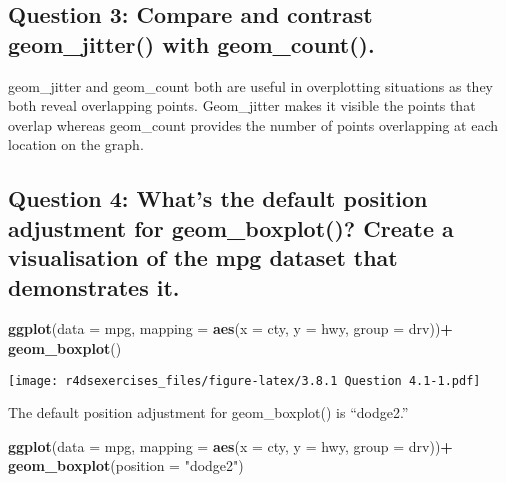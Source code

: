 \documentclass[
]{book}
\newenvironment{Shaded}{\begin{snugshade}}{\end{snugshade}}
\newcommand{\DataTypeTok}[1]{\textcolor[rgb]{0.13,0.29,0.53}{#1}}
\newcommand{\KeywordTok}[1]{\textcolor[rgb]{0.13,0.29,0.53}{\textbf{#1}}}
\newcommand{\NormalTok}[1]{#1}
\newcommand{\OperatorTok}[1]{\textcolor[rgb]{0.81,0.36,0.00}{\textbf{#1}}}
\newcommand{\StringTok}[1]{\textcolor[rgb]{0.31,0.60,0.02}{#1}}
\begin{document}
\hypertarget{question-3-compare-and-contrast-geom_jitter-with-geom_count.}{%
\subsection{Question 3: Compare and contrast geom\_jitter() with geom\_count().}\label{question-3-compare-and-contrast-geom_jitter-with-geom_count.}}

geom\_jitter and geom\_count both are useful in overplotting situations as they both reveal overlapping points. Geom\_jitter makes it visible the points that overlap whereas geom\_count provides the number of points overlapping at each location on the graph.

\hypertarget{question-4-whats-the-default-position-adjustment-for-geom_boxplot-create-a-visualisation-of-the-mpg-dataset-that-demonstrates-it.}{%
\subsection{Question 4: What's the default position adjustment for geom\_boxplot()? Create a visualisation of the mpg dataset that demonstrates it.}\label{question-4-whats-the-default-position-adjustment-for-geom_boxplot-create-a-visualisation-of-the-mpg-dataset-that-demonstrates-it.}}

\begin{Shaded}
\begin{Highlighting}[]
\KeywordTok{ggplot}\NormalTok{(}\DataTypeTok{data =}\NormalTok{ mpg, }\DataTypeTok{mapping =} \KeywordTok{aes}\NormalTok{(}\DataTypeTok{x =}\NormalTok{ cty, }\DataTypeTok{y =}\NormalTok{ hwy, }\DataTypeTok{group =}\NormalTok{ drv))}\OperatorTok{+}
\StringTok{  }\KeywordTok{geom_boxplot}\NormalTok{()}
\end{Highlighting}
\end{Shaded}

\texttt{[image: r4dsexercises\_files/figure-latex/3.8.1 Question 4.1-1.pdf]}

The default position adjustment for geom\_boxplot() is ``dodge2.''

\begin{Shaded}
\begin{Highlighting}[]
\KeywordTok{ggplot}\NormalTok{(}\DataTypeTok{data =}\NormalTok{ mpg, }\DataTypeTok{mapping =} \KeywordTok{aes}\NormalTok{(}\DataTypeTok{x =}\NormalTok{ cty, }\DataTypeTok{y =}\NormalTok{ hwy, }\DataTypeTok{group =}\NormalTok{ drv))}\OperatorTok{+}
\StringTok{  }\KeywordTok{geom_boxplot}\NormalTok{(}\DataTypeTok{position =} \StringTok{"dodge2"}\NormalTok{)}
\end{Highlighting}
\end{Shaded}
\end{document}
